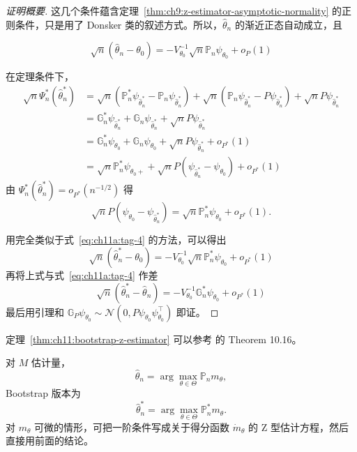 \begin{proof}[证明概要]
这几个条件蕴含定理~\ref{thm:ch9:z-estimator-asymptotic-normality} 的正则条件，只是用了 Donsker 类的叙述方式。所以，$\widehat\theta_n$ 的渐近正态自动成立，且

\begin{equation}
\label{eq:ch11a:tag-4}
\sqrt{n}(\widehat{\theta}_n - \theta_0) = -V_{\theta_0}^{-1}\sqrt n\mathbb P_n\psi_{\theta_0}  + o_P(1)
\end{equation}

在定理条件下，
\[\begin{aligned}\sqrt n\Psi_n^*(\widehat\theta_n^*) &=\sqrt n(\mathbb P_n^*\psi_{\widehat\theta_n^*}-\mathbb P_n\psi_{\widehat\theta_n^*})+\sqrt n(\mathbb P_n \psi_{\widehat\theta_n^*}-P\psi_{\widehat\theta_n^*})+\sqrt nP\psi_{\widehat\theta_n^*}\\  &=\mathbb G_n^*\psi_{\widehat\theta_n^*}+\mathbb G_n\psi_{\widehat\theta_n^*}+\sqrt n P\psi_{\widehat\theta_n^*}\\   &=\mathbb G_n^*\psi_{\theta_0}+\mathbb G_n\psi_{\theta_0}+\sqrt n P\psi_{\widehat\theta_n^*}+o_{P^*}(1)\\ &=\sqrt n\mathbb P_n^*\psi_{\theta_0+}+\sqrt n P(\psi_{\widehat\theta_n^*}-\psi_{\theta_0})+o_{P^*}(1) \end{aligned}\]
由 $\Psi_n^*(\widehat\theta_n^*)=o_{P^*}(n^{-1/2})$ 得
\[
\sqrt n P(\psi_{\theta_0}-\psi_{\widehat\theta_n^*})=\sqrt n \mathbb P_n^*\psi_{\theta_0}+o_{P^*}(1).
\]

用完全类似于式~\eqref{eq:ch11a:tag-4} 的方法，可以得出
\[ \sqrt{n}(\widehat{\theta}^*_n - \theta_0) = -V_{\theta_0}^{-1}\sqrt n\mathbb P^*_n\psi_{\theta_0} +o_{P^*}(1) \]再将上式与式~\eqref{eq:ch11a:tag-4} 作差
\[\sqrt n(\widehat\theta_n^*-\widehat\theta_n)=-V_{\theta_0}^{-1}\mathbb G_n^*\psi_{\theta_0}+o_{P^*}(1)\]
最后用引理和 $\mathbb G_P\psi_{\theta_0}\sim \mathcal N(0,P\psi_{\theta_0}\psi_{\theta_0}^\top)$ 即证。

\end{proof}

\begin{remark}
定理~\ref{thm:ch11:bootstrap-z-estimator} 可以参考 \cite{kosorok2008} 的 Theorem 10.16。
\end{remark}

对 $M$ 估计量，
\[\widehat{\theta}_n=\arg\max_{\theta\in\Theta}\mathbb{P}_nm_\theta,\]
Bootstrap 版本为
\[\widehat{\theta}_n^*=\arg\max_{\theta\in\Theta}\mathbb{P}_n^*m_\theta.\]
对 $m_\theta$ 可微的情形，可把一阶条件写成关于得分函数 $\dot{m}_\theta$ 的 Z 型估计方程，然后直接用前面的结论。

